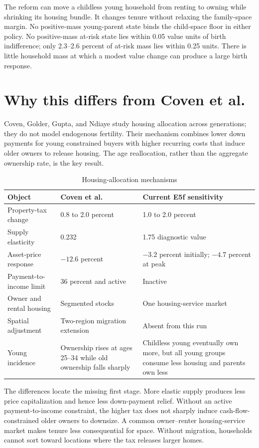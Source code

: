 \documentclass[10pt]{article}
\begin{document}
The reform can move a childless young household from renting to owning while shrinking its housing bundle. It changes tenure without relaxing the family-space margin. No positive-mass young-parent state binds the child-space floor in either policy. No positive-mass at-risk state lies within 0.05 value units of birth indifference; only 2.3--2.6 percent of at-risk mass lies within 0.25 units. There is little household mass at which a modest value change can produce a large birth response.

\newpage
\section*{Why this differs from Coven et al.}

Coven, Golder, Gupta, and Ndiaye study housing allocation across generations; they do not model endogenous fertility. Their mechanism combines lower down payments for young constrained buyers with higher recurring costs that induce older owners to release housing. The age reallocation, rather than the aggregate ownership rate, is the key result.

\begin{table}[h]
\centering
\caption{Housing-allocation mechanisms}
\scriptsize
\begin{tabularx}{\textwidth}{>{\raggedright\arraybackslash}p{}XX}
\toprule
Object & Coven et al. & Current E5f sensitivity \\
\midrule
Property-tax change & 0.8 to 2.0 percent & 1.0 to 2.0 percent \\
Supply elasticity & 0.232 & 1.75 diagnostic value \\
Asset-price response & $-12.6$ percent & $-3.2$ percent initially; $-4.7$ percent at peak \\
Payment-to-income limit & 36 percent and active & Inactive \\
Owner and rental housing & Segmented stocks & One housing-service market \\
Spatial adjustment & Two-region migration extension & Absent from this run \\
Young incidence & Ownership rises at ages 25--34 while old ownership falls sharply & Childless young eventually own more, but all young groups consume less housing and parents own less \\
\bottomrule
\end{tabularx}
\end{table}

The differences locate the missing first stage. More elastic supply produces less price capitalization and hence less down-payment relief. Without an active payment-to-income constraint, the higher tax does not sharply induce cash-flow-constrained older owners to downsize. A common owner--renter housing-service market makes tenure less consequential for space. Without migration, households cannot sort toward locations where the tax releases larger homes.
\end{document}
